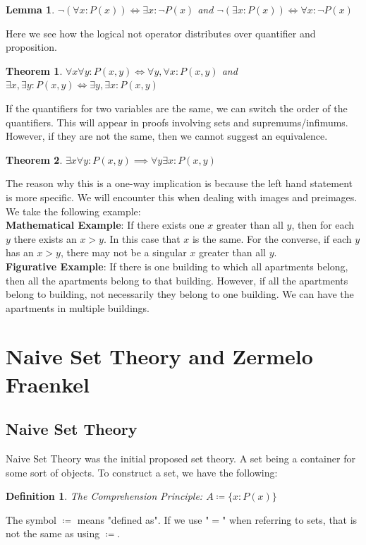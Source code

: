 \documentclass{article}
\newtheorem{thm}{Theorem}[section]
\newtheorem{lem}{Lemma}[section]
\newtheorem{defn}{Definition}[section]
\begin{document}
\begin{lem}
    $\lnot(\forall x : P(x)) \iff \exists x : \lnot P(x)$ and $\lnot(\exists x: P(x)) \iff \forall x : \lnot P(x)$
\end{lem}
Here we see how the logical not operator distributes over quantifier and proposition.\\

\begin{thm}
    $\forall x \forall y: P(x, y) \iff \forall y, \forall x: P(x, y)$ and $\exists x, \exists y: P(x, y) \iff \exists y, \exists x: P(x, y)$
\end{thm}
If the quantifiers for two variables are the same, we can switch the order of the quantifiers. This will appear in proofs involving sets and supremums/infimums. However, if they are not the same, then we cannot suggest an equivalence.\\

\begin{thm}
    $\exists x \forall y: P(x, y) \implies \forall y \exists x: P(x, y)$
\end{thm}
The reason why this is a one-way implication is because the left hand statement is more specific. We will encounter this when dealing with images and preimages. We take the following example:\\

\textbf{Mathematical Example}: If there exists one $x$ greater than all $y$, then for each $y$ there exists an $x > y$. In this case that $x$ is the same. For the converse, if each $y$ has an $x > y$, there may not be a singular $x$ greater than all $y$.\\

\textbf{Figurative Example}: If there is one building to which all apartments belong, then all the apartments belong to that building. However, if all the apartments belong to  building, not necessarily they belong to one building. We can have the apartments in multiple buildings.
\pagebreak


\section{Naive Set Theory and Zermelo Fraenkel}
\subsection{Naive Set Theory}
Naive Set Theory was the initial proposed set theory. A set being a container for some sort of objects. To construct a set, we have the following:
\begin{defn}
    The Comprehension Principle: $A \coloneq \{x : P(x)\}$
\end{defn}
The symbol $\coloneq$ means "defined as". If we use "$=$" when referring to sets, that is not the same as using $\coloneq$.\\
\end{document}
